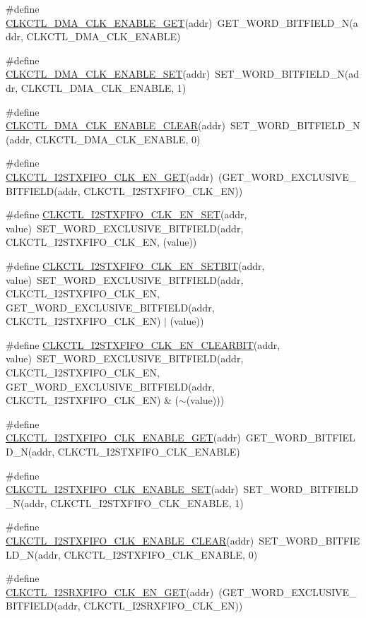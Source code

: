 \begin{DoxyCompactItemize}
\item 
\#define \hyperlink{a00544_a9fc51d0f17ff35ff3db3f4286214fde7}{CLKCTL\_\-DMA\_\-CLK\_\-ENABLE\_\-GET}(addr)~GET\_\-WORD\_\-BITFIELD\_\-N(addr, CLKCTL\_\-DMA\_\-CLK\_\-ENABLE)
\item 
\#define \hyperlink{a00544_a34db93f1e2a349a888da77d09b287a1d}{CLKCTL\_\-DMA\_\-CLK\_\-ENABLE\_\-SET}(addr)~SET\_\-WORD\_\-BITFIELD\_\-N(addr, CLKCTL\_\-DMA\_\-CLK\_\-ENABLE, 1)
\item 
\#define \hyperlink{a00544_ab4004190555d4a375410dd9a3b07a68e}{CLKCTL\_\-DMA\_\-CLK\_\-ENABLE\_\-CLEAR}(addr)~SET\_\-WORD\_\-BITFIELD\_\-N(addr, CLKCTL\_\-DMA\_\-CLK\_\-ENABLE, 0)
\item 
\#define \hyperlink{a00544_ae67ac438b30f5a2db98ad8642e4c7a9f}{CLKCTL\_\-I2STXFIFO\_\-CLK\_\-EN\_\-GET}(addr)~(GET\_\-WORD\_\-EXCLUSIVE\_\-BITFIELD(addr, CLKCTL\_\-I2STXFIFO\_\-CLK\_\-EN))
\item 
\#define \hyperlink{a00544_a93c6ddab09ec9030f29d69597f1d14df}{CLKCTL\_\-I2STXFIFO\_\-CLK\_\-EN\_\-SET}(addr, value)~SET\_\-WORD\_\-EXCLUSIVE\_\-BITFIELD(addr, CLKCTL\_\-I2STXFIFO\_\-CLK\_\-EN, (value))
\item 
\#define \hyperlink{a00544_af73bb4a7001de9b63f18bc63ff27172a}{CLKCTL\_\-I2STXFIFO\_\-CLK\_\-EN\_\-SETBIT}(addr, value)~SET\_\-WORD\_\-EXCLUSIVE\_\-BITFIELD(addr, CLKCTL\_\-I2STXFIFO\_\-CLK\_\-EN, GET\_\-WORD\_\-EXCLUSIVE\_\-BITFIELD(addr, CLKCTL\_\-I2STXFIFO\_\-CLK\_\-EN) $|$ (value))
\item 
\#define \hyperlink{a00544_a4f785b259bf36f6f6ac2b61ba148e68f}{CLKCTL\_\-I2STXFIFO\_\-CLK\_\-EN\_\-CLEARBIT}(addr, value)~SET\_\-WORD\_\-EXCLUSIVE\_\-BITFIELD(addr, CLKCTL\_\-I2STXFIFO\_\-CLK\_\-EN, GET\_\-WORD\_\-EXCLUSIVE\_\-BITFIELD(addr, CLKCTL\_\-I2STXFIFO\_\-CLK\_\-EN) \& ($\sim$(value)))
\item 
\#define \hyperlink{a00544_adaaab8acc5ae62eb5e0be90dc64b27cb}{CLKCTL\_\-I2STXFIFO\_\-CLK\_\-ENABLE\_\-GET}(addr)~GET\_\-WORD\_\-BITFIELD\_\-N(addr, CLKCTL\_\-I2STXFIFO\_\-CLK\_\-ENABLE)
\item 
\#define \hyperlink{a00544_a616d26c649b9629a71cbe97f276bff8d}{CLKCTL\_\-I2STXFIFO\_\-CLK\_\-ENABLE\_\-SET}(addr)~SET\_\-WORD\_\-BITFIELD\_\-N(addr, CLKCTL\_\-I2STXFIFO\_\-CLK\_\-ENABLE, 1)
\item 
\#define \hyperlink{a00544_ab541495486da860b1a2f754c6394011e}{CLKCTL\_\-I2STXFIFO\_\-CLK\_\-ENABLE\_\-CLEAR}(addr)~SET\_\-WORD\_\-BITFIELD\_\-N(addr, CLKCTL\_\-I2STXFIFO\_\-CLK\_\-ENABLE, 0)
\item 
\#define \hyperlink{a00544_a12e956ae73679584ce07b19f582b3ecf}{CLKCTL\_\-I2SRXFIFO\_\-CLK\_\-EN\_\-GET}(addr)~(GET\_\-WORD\_\-EXCLUSIVE\_\-BITFIELD(addr, CLKCTL\_\-I2SRXFIFO\_\-CLK\_\-EN))

\end{DoxyCompactItemize}
